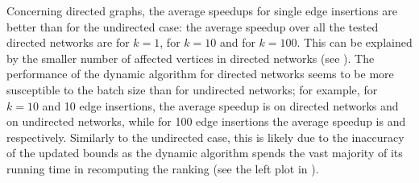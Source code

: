 Concerning directed graphs, the average speedups for single edge insertions are better
than for the undirected case: the average speedup over all the tested directed
networks are \speedupComplexDirInsertKOneBOne for $k = 1$,
\speedupComplexDirInsertKTenBOne for $k = 10$ and
\speedupComplexDirInsertKHundredBOne for $k = 100$.
%
This can be explained by the smaller number of affected vertices in directed networks
(see ). The performance of the dynamic
algorithm for directed networks seems to be more susceptible to the batch
size than for undirected networks; for example, for $k = 10$ and 10 edge insertions,
the average speedup is \speedupComplexDirInsertKTenBTen on
directed networks and \speedupComplexUndInsertKTenBTen on undirected networks,
while for 100 edge insertions the average speedup is
\speedupComplexDirInsertKTenBHundred and \speedupComplexUndInsertKTenBHundred
respectively.
%
Similarly to the undirected case, this is likely due to the inaccuracy of the
updated bounds as the dynamic algorithm spends the vast majority of its running
time in recomputing the ranking (see the left plot in
).

